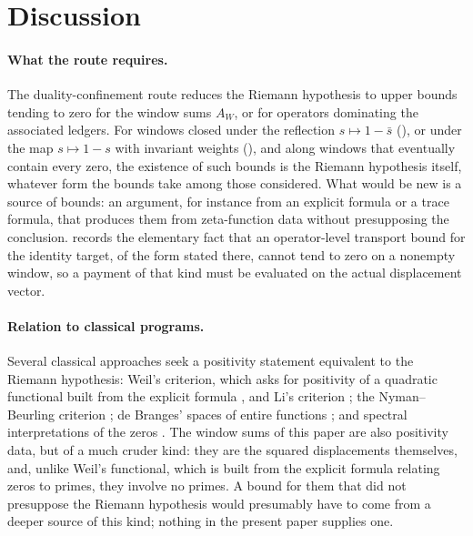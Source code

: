\documentclass[11pt]{article}
\theoremstyle{definition}
\begin{document}
 \section{Discussion}
\label{sec:discussion}

\paragraph{What the route requires.}
The duality-confinement route reduces the Riemann hypothesis to upper
bounds tending to zero for the window sums \(A_W\), or for operators
dominating the associated ledgers.  For windows closed under the
reflection \(s\mapsto1-\bar s\) (), or under the map \(s\mapsto1-s\) with invariant weights
(), and along windows that eventually
contain every zero, the existence of such bounds is the Riemann
hypothesis itself, whatever form the bounds take among those
considered.  What would be new is a source of bounds: an argument, for
instance from an explicit formula or a trace formula, that produces
them from zeta-function data without presupposing the conclusion.
 records the elementary fact that an operator-level transport bound for
the identity target, of the form stated there, cannot tend to zero on a
nonempty window, so a payment of that kind must be evaluated on the
actual displacement vector.

\paragraph{Relation to classical programs.}
Several classical approaches seek a positivity statement equivalent to
the Riemann hypothesis: Weil's criterion, which asks for positivity of
a quadratic functional built from the explicit formula
\citep{Weil1952,Bombieri2000}, and Li's criterion \citep{Li1997}; the Nyman--Beurling criterion
\citep{Nyman1950,Beurling1955,BaezDuarte2003}; de Branges' spaces of
entire functions \citep{deBranges1968,deBranges1986}; and spectral
interpretations of the zeros \citep{BerryKeating1990,Connes1999}.  The window sums of this paper are also positivity data, but of a much
cruder kind: they are the squared displacements themselves, and, unlike Weil's functional, which is built from the explicit
formula relating zeros to primes, they involve no primes.  A bound
for them that did not presuppose the Riemann hypothesis would presumably
have to come from a deeper source of this kind; nothing in the present paper
supplies one.
\end{document}

